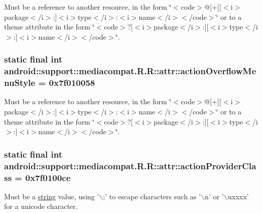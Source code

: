 Must be a reference to another resource, in the form \char`\"{}$<$code$>$@\mbox{[}+\mbox{]}\mbox{[}$<$i$>$package$<$/i$>$:\mbox{]}$<$i$>$type$<$/i$>$:$<$i$>$name$<$/i$>$$<$/code$>$\char`\"{} or to a theme attribute in the form \char`\"{}$<$code$>$?\mbox{[}$<$i$>$package$<$/i$>$:\mbox{]}\mbox{[}$<$i$>$type$<$/i$>$:\mbox{]}$<$i$>$name$<$/i$>$$<$/code$>$\char`\"{}. \hypertarget{classandroid_1_1support_1_1mediacompat_1_1_r_1_1attr_b07b16e090d26154bf8326a821e702c6}{
\subsubsection[{actionOverflowMenuStyle}]{\setlength{\rightskip}{0pt plus 5cm}static final int android::support::mediacompat.R.R::attr::actionOverflowMenuStyle = 0x7f010058}}
\label{classandroid_1_1support_1_1mediacompat_1_1_r_1_1attr_b07b16e090d26154bf8326a821e702c6}


Must be a reference to another resource, in the form \char`\"{}$<$code$>$@\mbox{[}+\mbox{]}\mbox{[}$<$i$>$package$<$/i$>$:\mbox{]}$<$i$>$type$<$/i$>$:$<$i$>$name$<$/i$>$$<$/code$>$\char`\"{} or to a theme attribute in the form \char`\"{}$<$code$>$?\mbox{[}$<$i$>$package$<$/i$>$:\mbox{]}\mbox{[}$<$i$>$type$<$/i$>$:\mbox{]}$<$i$>$name$<$/i$>$$<$/code$>$\char`\"{}. \hypertarget{classandroid_1_1support_1_1mediacompat_1_1_r_1_1attr_f6d59f1cff8e7050c66cd346bdb850f6}{
\subsubsection[{actionProviderClass}]{\setlength{\rightskip}{0pt plus 5cm}static final int android::support::mediacompat.R.R::attr::actionProviderClass = 0x7f0100ce}}
\label{classandroid_1_1support_1_1mediacompat_1_1_r_1_1attr_f6d59f1cff8e7050c66cd346bdb850f6}


Must be a \hyperlink{classandroid_1_1support_1_1mediacompat_1_1_r_1_1string}{string} value, using '$\backslash$;' to escape characters such as '$\backslash$n' or '$\backslash$uxxxx' for a unicode character. 

